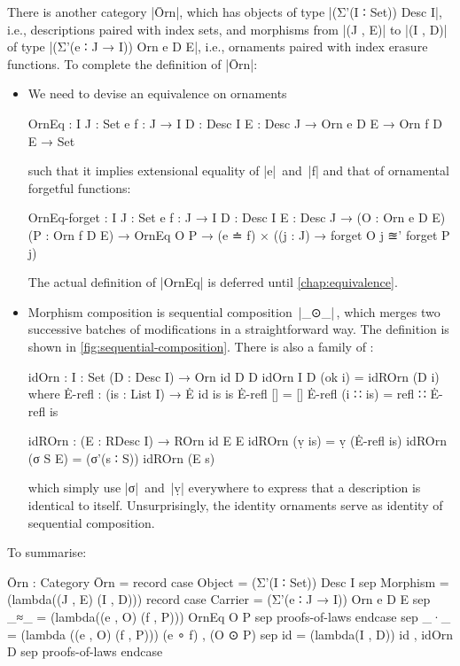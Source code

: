 There is another category |Ōrn|, which has objects of type |(Σ'(I ∶ Set)) Desc I|, i.e., descriptions paired with index sets, and morphisms from |(J , E)| to |(I , D)| of type |(Σ'(e ∶ J → I)) Orn e D E|, i.e., ornaments paired with index erasure functions.
To complete the definition of |Ōrn|:
\begin{itemize}
\item We need to devise an equivalence on ornaments
\begin{code}
OrnEq :  {I J : Set} {e f : J → I} {D : Desc I} {E : Desc J} →
         Orn e D E → Orn f D E → Set
\end{code}
such that it implies extensional equality of |e|~and~|f| and that of ornamental forgetful functions:
\begin{code}
OrnEq-forget :  {I J : Set} {e f : J → I} {D : Desc I} {E : Desc J} →
                (O : Orn e D E) (P : Orn f D E) → OrnEq O P →
                (e ≐ f) × ((j : J) → forget O {j} ≊' forget P {j})
\end{code}
The actual definition of |OrnEq| is deferred until \autoref{chap:equivalence}.

\item Morphism composition is sequential composition~|_⊙_|\,, which merges two successive batches of modifications in a straightforward way.
The definition is shown in \autoref{fig:sequential-composition}.
There is also a family of :
\begin{code}
idOrn : {I : Set} (D : Desc I) → Orn id D D
idOrn {I} D (ok i) = idROrn (D i)
  where
    Ė-refl : (is : List I) → Ė id is is
    Ė-refl []        = []
    Ė-refl (i ∷ is)  = refl ∷ Ė-refl is

    idROrn : (E : RDesc I) → ROrn id E E
    idROrn (ṿ is)   = ṿ (Ė-refl is)
    idROrn (σ S E)  = (σ'(s ∶ S)) idROrn (E s)
\end{code}
which simply use |σ|~and~|ṿ| everywhere to express that a description is identical to itself.
Unsurprisingly, the identity ornaments serve as identity of sequential composition.
\end{itemize}
To summarise:
\begin{code}
Ōrn : Category
Ōrn = record
  case  Object    =  (Σ'(I ∶ Set)) Desc I
  sep   Morphism  =  (lambda((J , E) (I , D))) record
                       case  Carrier  =  (Σ'(e ∶ J → I)) Orn e D E
                       sep   _≈_      =  (lambda((e , O) (f , P))) OrnEq O P
                       sep  proofs-of-laws endcase
  sep   _·_  =  (lambda ((e , O) (f , P))) (e ∘ f) , (O ⊙ P)
  sep   id   =  (lambda({I , D})) id , idOrn D
  sep   proofs-of-laws endcase
\end{code}

